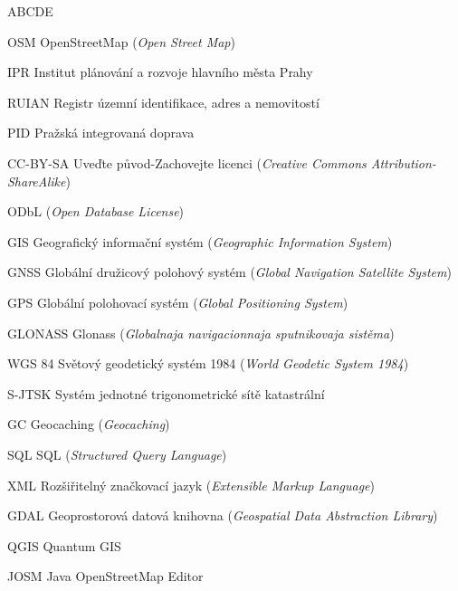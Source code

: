 \begin{seznamzkratek}{ABCDE}

		{OSM}
		{OpenStreetMap (\textit{Open Street Map})}

	    {IPR}
        {Institut plánování a rozvoje hlavního města Prahy}

	    {RUIAN}
        {Registr územní identifikace, adres a nemovitostí}

	    {PID}
        {Pražská integrovaná doprava}

		{CC-BY-SA}
		{Uveďte původ-Zachovejte licenci (\textit{Creative Commons Attribution-ShareAlike})}

		{ODbL}
		{(\textit{Open Database License})}

	    {GIS}
 	    {Geografický informační systém  (\textit{Geographic Information System})}

		{GNSS}
		{Globální družicový polohový systém (\textit{Global Navigation Satellite System})}

		{GPS}
		{Globální polohovací systém (\textit{Global Positioning System})}

		{GLONASS}
		{Glonass (\textit{Globalnaja navigacionnaja sputnikovaja sistěma})}

		{WGS 84}
		{Světový geodetický systém 1984 (\textit{World Geodetic System 1984})}

		{S-JTSK}
		{Systém jednotné trigonometrické sítě katastrální}

		{GC}
		{Geocaching (\textit{Geocaching})}

		{SQL}
		{SQL (\textit{Structured Query Language})}

		{XML}
		{Rozšiřitelný značkovací jazyk (\textit{Extensible Markup Language})}

		{GDAL}
		{Geoprostorová datová knihovna (\textit{Geospatial Data Abstraction Library})}

        {QGIS}
        {Quantum GIS}

        {JOSM}
        {Java OpenStreetMap Editor}


\end{seznamzkratek}
